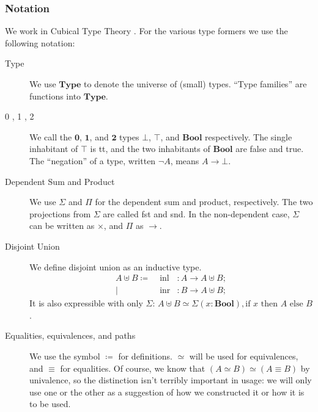 \subsubsection{Notation}
We work in Cubical Type Theory \cite{cohenCubicalTypeTheory2016}.
For the various type formers we use the following notation:
\begin{description}
  \item[Type] We use \(\mathbf{Type}\) to denote the universe of (small) types.
    ``Type families'' are functions into \(\mathbf{Type}\).
  \item[0 , 1 , 2] We call the \(\mathbf{0}\), \(\mathbf{1}\), and
    \(\mathbf{2}\) types \(\bot\), \(\top\), and \(\mathbf{Bool}\) respectively.
    The single inhabitant of \(\top\) is tt, and the two inhabitants of
    \(\mathbf{Bool}\) are false and true.
    The ``negation'' of a type, written \(\neg A\), means \(A \rightarrow
    \bot\).
  \item[Dependent Sum and Product] We use \(\Sigma\) and \(\Pi\) for the
    dependent sum and product, respectively.
    The two projections from \(\Sigma\) are called fst and snd.
    In the non-dependent case, \(\Sigma\) can be written as \(\times\), and
    \(\Pi\) as \(\rightarrow\).
  \item[Disjoint Union] We define disjoint union as an inductive type.
    \begin{equation}
      \begin{alignedat}{3}
        A \uplus B \coloneqq & \;
        \text{inl} &: A \rightarrow A \uplus B ; \\
        | & \;  \text{inr} &: B \rightarrow A \uplus B ;
      \end{alignedat}
    \end{equation}
    It is also expressible with only \(\Sigma\):
    \(A \uplus B \simeq \Sigma(x : \mathbf{Bool}) , \text{if } x \text{ then
    } A \text{ else } B \).
  \item[Equalities, equivalences, and paths] We use the symbol \(\coloneqq\)
    for definitions.
    \(\simeq\) will be used for equivalences, and \(\equiv\) for equalities.
    Of course, we know that \((A \simeq B) \simeq (A \equiv B)\) by univalence,
    so the distinction isn't terribly important in usage: we will only use one
    or the other as a suggestion of how we constructed it or how it is to be
    used.
\end{description}
